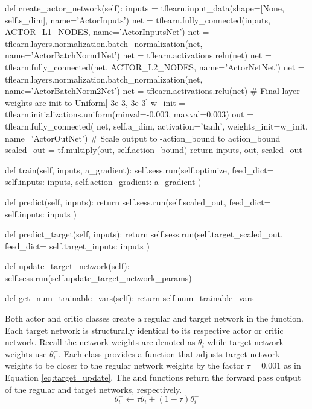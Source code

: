 \begin{python}[caption={Actor Network Class},label={list:actor_net}]
    def create_actor_network(self):
        inputs = tflearn.input_data(shape=[None, self.s_dim], name='ActorInputs')
        net = tflearn.fully_connected(inputs, ACTOR_L1_NODES, name='ActorInputsNet')
        net = tflearn.layers.normalization.batch_normalization(net, name='ActorBatchNorm1Net')
        net = tflearn.activations.relu(net)
        net = tflearn.fully_connected(net, ACTOR_L2_NODES, name='ActorNetNet')
        net = tflearn.layers.normalization.batch_normalization(net, name='ActorBatchNorm2Net')
        net = tflearn.activations.relu(net)
        # Final layer weights are init to Uniform[-3e-3, 3e-3]
        w_init = tflearn.initializations.uniform(minval=-0.003, maxval=0.003)
        out = tflearn.fully_connected(
            net, self.a_dim, activation='tanh', weights_init=w_init, name='ActorOutNet')
        # Scale output to -action_bound to action_bound
        scaled_out = tf.multiply(out, self.action_bound)
        return inputs, out, scaled_out

    def train(self, inputs, a_gradient):
        self.sess.run(self.optimize, feed_dict={
            self.inputs: inputs,
            self.action_gradient: a_gradient
        })

    def predict(self, inputs):
        return self.sess.run(self.scaled_out, feed_dict={
            self.inputs: inputs
        })

    def predict_target(self, inputs):
        return self.sess.run(self.target_scaled_out, feed_dict={
            self.target_inputs: inputs
        })

    def update_target_network(self):
        self.sess.run(self.update_target_network_params)

    def get_num_trainable_vars(self):
        return self.num_trainable_vars
\end{python}

Both actor and critic classes create a regular and target network in the \mbox{} function. Each target network is structurally identical to its respective actor or critic network. Recall the network weights are denoted as $\theta_i$ while target network weights use $\theta^-_i$. Each class provides a function   that adjusts target network weights to be closer to the regular network weights by the factor $\tau=0.001$ as in Equation \ref{eq:target_update}. The  and  functions return the forward pass output of the regular and target networks, respectively.
\begin{equation}
\label{eq:target_update}
\theta^-_i \gets \tau\theta_i + (1-\tau)\theta^-_i
\end{equation}

